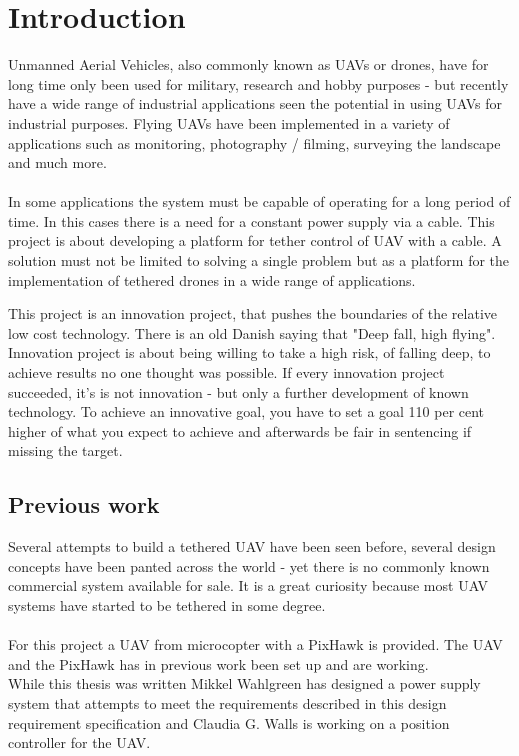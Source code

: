 \chapter{Introduction}

Unmanned Aerial Vehicles, also commonly known as UAVs or drones, have for long time only been used for military, research and hobby purposes - but recently have a wide range of industrial applications seen the potential in using UAVs for industrial purposes.
Flying UAVs have been implemented in a variety of applications such as monitoring, photography / filming, surveying the landscape and much more.\\
\\
In some applications the system must be capable of operating for a long period of time. In this cases there is a need for a constant power supply via a cable. This project is about developing a platform for tether control of UAV with a cable.
A solution must not be limited to solving a single problem but as a platform for the implementation of tethered drones in a wide range of applications.

\noindent
This project is an innovation project, that pushes the boundaries of the relative low cost technology. There is an old Danish saying that "Deep fall, high flying". Innovation project is about being willing to take a high risk, of falling deep, to achieve results no one thought was possible. If every innovation project succeeded, it's is not innovation - but only a further development of known technology. To achieve an innovative goal, you have to set a goal 110 per cent higher of what you expect to achieve and afterwards be fair in sentencing if missing the target.

\section{Previous work}
Several attempts to build a tethered UAV have been seen before, several design concepts have been panted across the world - yet there is no commonly known commercial system available for sale. It is a great curiosity because most UAV systems have started to be tethered in some degree.\\
\\
For this project a UAV from microcopter with a PixHawk is provided. The UAV and the PixHawk has in previous work been set up and are working.\\
\noindent
While this thesis was written Mikkel Wahlgreen has designed a power supply system \cite{Wahlgreen2014} that attempts to meet the requirements described in this design requirement specification and Claudia G. Walls is working on a position controller for the UAV.\\
 


